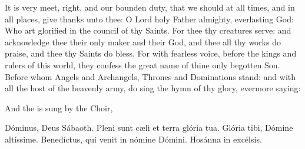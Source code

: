 
\vspace{1\baselineskip}
\par\noindent
It is very meet, right, and our bounden duty, that we should at all times, and in all places, give thanks unto thee: O Lord holy Father almighty, everlasting God: Who art glorified in the council of thy Saints. For thee thy creatures serve: and acknowledge thee their only maker and their God, and thee all thy works do praise, and thee thy Saints do bless. For with fearless voice, before the kings and rulers of this world, they confess the great name of thine only begotten Son. Before whom Angels and Archangels, Thrones and Dominations stand: and with all the host of the heavenly army, do sing the hymn of thy glory, evermore saying:

\begin{rubric}
    And the  is sung by the Choir,
\end{rubric}

{ Dóminus, Deus Sábaoth. Pleni sunt c{\ae}li et terra glória tua. Glória tibi, Dómine altíssime. Benedíctus, {} qui venit in nómine Dómini. Hosánna in excélsis.}


